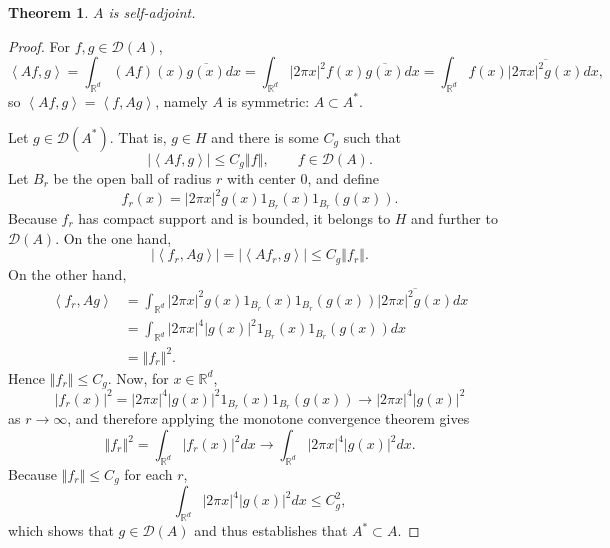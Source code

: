 \documentclass{article}
\newcommand{\inner}[2]{\left\langle #1, #2 \right\rangle}
\newcommand{\norm}[1]{\left\Vert #1 \right\Vert}
\newtheorem{theorem}{Theorem}
\theoremstyle{definition}
\begin{document}
\begin{theorem}
$A$ is self-adjoint.
\label{selfadjoint}
\end{theorem}
\begin{proof}
For $f,g \in \mathscr{D}(A)$,
\[
\inner{Af}{g} = \int_{\mathbb{R}^d} (Af)(x) \overline{g(x)} dx
=\int_{\mathbb{R}^d} |2\pi x|^2 f(x) \overline{g(x)} dx
=\int_{\mathbb{R}^d} f(x) \overline{|2\pi x|^2 g(x)} dx,
\]
so $\inner{Af}{g}=\inner{f}{Ag}$, namely $A$ is symmetric:
$A \subset A^*$. 


Let
 $g \in \mathscr{D}(A^*)$.  That is, $g \in H$ and there is some $C_g$ such that 
\[
|\inner{Af}{g}| \leq C_g \norm{f}, \qquad f \in \mathscr{D}(A). 
\]
Let $B_r$ be the open ball of radius $r$ with center $0$, and
define 
\[
f_r(x) = |2\pi x|^2 g(x) 1_{B_r}(x) 1_{B_r}(g(x)).
\]
Because $f_r$ has compact  support and is  bounded, it belongs to $H$ and further to $\mathscr{D}(A)$. 
On the one hand,
\[
|\inner{f_r}{Ag}| = |\inner{Af_r}{g}| \leq C_g \norm{f_r}.
\]
On the other hand,
\begin{align*}
\inner{f_r}{Ag}&=\int_{\mathbb{R}^d}  |2\pi x|^2 g(x) 1_{B_r}(x) 1_{B_r}(g(x)) \overline{|2\pi x|^2 g(x)} dx\\
&=\int_{\mathbb{R}^d} |2\pi x|^4 |g(x)|^2 1_{B_r}(x) 1_{B_r}(g(x)) dx\\
&=\norm{f_r}^2.
\end{align*}
Hence $\norm{f_r} \leq C_g$. 
Now, for $x \in \mathbb{R}^d$, 
\[
|f_r(x)|^2 = |2\pi x|^4 |g(x)|^2 1_{B_r}(x) 1_{B_r}(g(x)) \to |2\pi x|^4 |g(x)|^2
\]
as $r \to \infty$, and therefore applying the monotone convergence theorem gives
\[
\norm{f_r}^2=\int_{\mathbb{R}^d} |f_r(x)|^2 dx \to \int_{\mathbb{R}^d}  |2\pi x|^4 |g(x)|^2 dx.
\]
Because $\norm{f_r} \leq C_g$ for each $r$, 
\[
\int_{\mathbb{R}^d}  |2\pi x|^4 |g(x)|^2 dx \leq C_g^2,
\]
which shows that $g \in \mathscr{D}(A)$ and thus establishes that $A^* \subset A$.
\end{proof}
\end{document}
